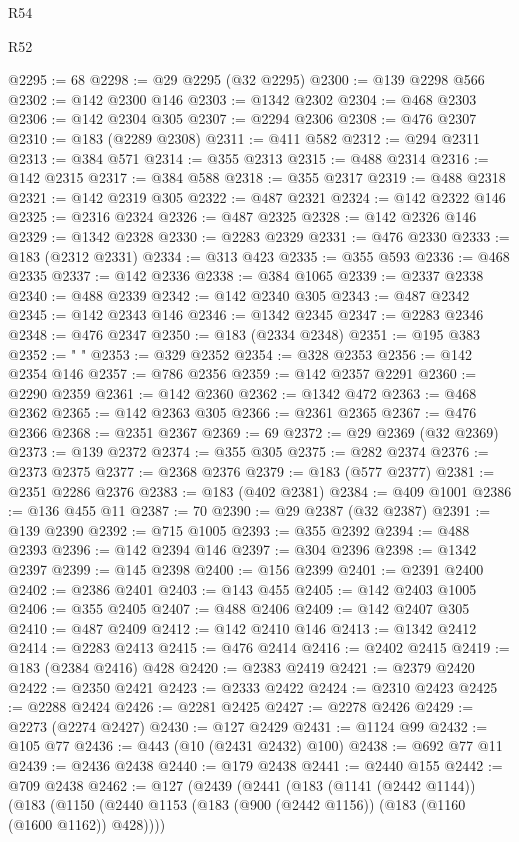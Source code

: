 \begin{lexlean}{R54}
\begin{lexlean}{R52}
\begin{coremodule}
{{{{{{{{{{{{{{{{{{{{{{{{{{{{{{{{{{{{{{{{{{{{{{{{{{{{{{{{{{{{{{{{{{{{{{{{{{{{{{{{{{{{{{{{{{{{{{{{{{{{{{{{{{{{{{{{{{{{{{{{{{{{{{{{{{{{{{{{{{{{{{{{{{{{{{{{{{{{{{{{{{{{{{{{{{{{{{{{{{{{{{{{{{{{{{{{{{{{{{@2295 := 68
@2298 := @29 @2295 (@32 @2295)
@2300 := @139 @2298 @566
@2302 := @142 @2300 @146
@2303 := @1342 @2302
@2304 := @468 @2303
@2306 := @142 @2304 @305
@2307 := @2294 @2306
@2308 := @476 @2307
@2310 := @183 (@2289 @2308)
@2311 := @411 @582
@2312 := @294 @2311
@2313 := @384 @571
@2314 := @355 @2313
@2315 := @488 @2314
@2316 := @142 @2315
@2317 := @384 @588
@2318 := @355 @2317
@2319 := @488 @2318
@2321 := @142 @2319 @305
@2322 := @487 @2321
@2324 := @142 @2322 @146
@2325 := @2316 @2324
@2326 := @487 @2325
@2328 := @142 @2326 @146
@2329 := @1342 @2328
@2330 := @2283 @2329
@2331 := @476 @2330
@2333 := @183 (@2312 @2331)
@2334 := @313 @423
@2335 := @355 @593
@2336 := @468 @2335
@2337 := @142 @2336
@2338 := @384 @1065
@2339 := @2337 @2338
@2340 := @488 @2339
@2342 := @142 @2340 @305
@2343 := @487 @2342
@2345 := @142 @2343 @146
@2346 := @1342 @2345
@2347 := @2283 @2346
@2348 := @476 @2347
@2350 := @183 (@2334 @2348)
@2351 := @195 @383
@2352 := " "
@2353 := @329 @2352
@2354 := @328 @2353
@2356 := @142 @2354 @146
@2357 := @786 @2356
@2359 := @142 @2357 @2291
@2360 := @2290 @2359
@2361 := @142 @2360
@2362 := @1342 @472
@2363 := @468 @2362
@2365 := @142 @2363 @305
@2366 := @2361 @2365
@2367 := @476 @2366
@2368 := @2351 @2367
@2369 := 69
@2372 := @29 @2369 (@32 @2369)
@2373 := @139 @2372
@2374 := @355 @305
@2375 := @282 @2374
@2376 := @2373 @2375
@2377 := @2368 @2376
@2379 := @183 (@577 @2377)
@2381 := @2351 @2286 @2376
@2383 := @183 (@402 @2381)
@2384 := @409 @1001
@2386 := @136 @455 @11
@2387 := 70
@2390 := @29 @2387 (@32 @2387)
@2391 := @139 @2390
@2392 := @715 @1005
@2393 := @355 @2392
@2394 := @488 @2393
@2396 := @142 @2394 @146
@2397 := @304 @2396
@2398 := @1342 @2397
@2399 := @145 @2398
@2400 := @156 @2399
@2401 := @2391 @2400
@2402 := @2386 @2401
@2403 := @143 @455
@2405 := @142 @2403 @1005
@2406 := @355 @2405
@2407 := @488 @2406
@2409 := @142 @2407 @305
@2410 := @487 @2409
@2412 := @142 @2410 @146
@2413 := @1342 @2412
@2414 := @2283 @2413
@2415 := @476 @2414
@2416 := @2402 @2415
@2419 := @183 (@2384 @2416) @428
@2420 := @2383 @2419
@2421 := @2379 @2420
@2422 := @2350 @2421
@2423 := @2333 @2422
@2424 := @2310 @2423
@2425 := @2288 @2424
@2426 := @2281 @2425
@2427 := @2278 @2426
@2429 := @2273 (@2274 @2427)
@2430 := @127 @2429
@2431 := @1124 @99
@2432 := @105 @77
@2436 := @443 (@10 (@2431 @2432) @100)
@2438 := @692 @77 @11
@2439 := @2436 @2438
@2440 := @179 @2438
@2441 := @2440 @155
@2442 := @709 @2438
@2462 := @127
    (@2439
      (@2441
        (@183
          (@1141 (@2442 @1144))
          (@183
            (@1150 (@2440 @1153 (@183 (@900 (@2442 @1156)) (@183 (@1160 (@1600 @1162)) @428))))
}}}}}}}}}}}}}}}}}}}}}}}}}}}}}}}}}}}}}}}}}}}}}}}}}}}}}}}}}}}}}}}}}}}}}}}}}}}}}}}}}}}}}}}}}}}}}}}}}}}}}}}}}}}}}}}}}}}}}}}}}}}}}}}}}}}}}}}}}}}}}}}}}}}}}}}}}}}}}}}}}}}}}}}}}}}}}}}}}}}}}}}}}}}}}}}}}}}}}}
\end{coremodule}
\end{lexlean}
\end{lexlean}
